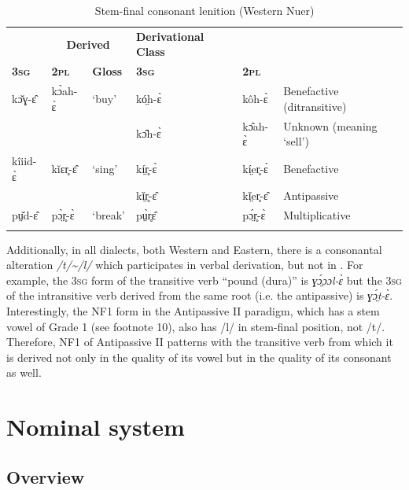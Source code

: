 \documentclass[output=paper,newtxmath,modfonts,nonflat]{langsci/langscibook}
\begin{document}
\begin{table}
\begin{tabularx}{\textwidth}{lllllX}
\lsptoprule

\multicolumn{3}{c}{\bfseries Transitive} & \multicolumn{2}{c}{\bfseries Derived} & \bfseries Derivational Class\\
\bfseries\scshape 3sg & \bfseries\scshape 2pl & \bfseries Gloss & \bfseries\scshape 3sg & \multicolumn{1}{l}{\bfseries\scshape 2pl} & \\
\midrule
kɔ̌ɣ-ɛ̂ & kɔ̀ah-ɛ̀ & ‘buy’ & kó̤h-ɛ̀ & kôh-ɛ̀ & Benefactive (ditransitive)\\
&  &  & kɔ̂h-ɛ̀ & kɔ̂ah-ɛ̀ & Unknown (meaning ‘sell’)\\

\tablevspace
kîiid-ɛ̀ & kǐɛr̥-ɛ̂ & ‘sing’ & kí̤r̥-ɛ̀ & kí̤er̥-ɛ̀ & Benefactive\\
&  &  & kǐ̤r̥-ɛ̂ & kǐ̤er̥-ɛ̂ & Antipassive\\

\tablevspace
pṳ̌d-ɛ̂ & pɔ̤̀r̥-ɛ̀ & ‘break’ & pṳ̀r̥ɛ̂ & pɔ̤́r̥-ɛ̀ & Multiplicative\\
\lspbottomrule
\end{tabularx}
\caption{Stem-final consonant lenition (Western Nuer)}
\label{tab:monich:16}
\end{table}

Additionally, in all  dialects, both Western and Eastern, there is a consonantal alteration \textit{/t/{\textasciitilde}/l/} which participates in verbal derivation, but not in . For example, the 3\textsc{sg} form of the transitive verb “pound (dura)” is \textit{ɣɔ̤́ɔɔl-ɛ̀} but the 3\textsc{sg} of the intransitive verb derived from the same root (i.e. the antipassive) is \textit{ɣɔ̤́t-ɛ̀}. Interestingly, the NF1 form in the Antipassive II paradigm, which has a stem vowel of Grade 1 (see footnote 10), also has /l/ in stem-final position, not /t/. Therefore, NF1 of Antipassive II patterns with the transitive verb from which it is derived not only in the quality of its vowel but in the quality of its consonant as well.

\section{Nominal system}
\subsection{Overview}
\end{document}
